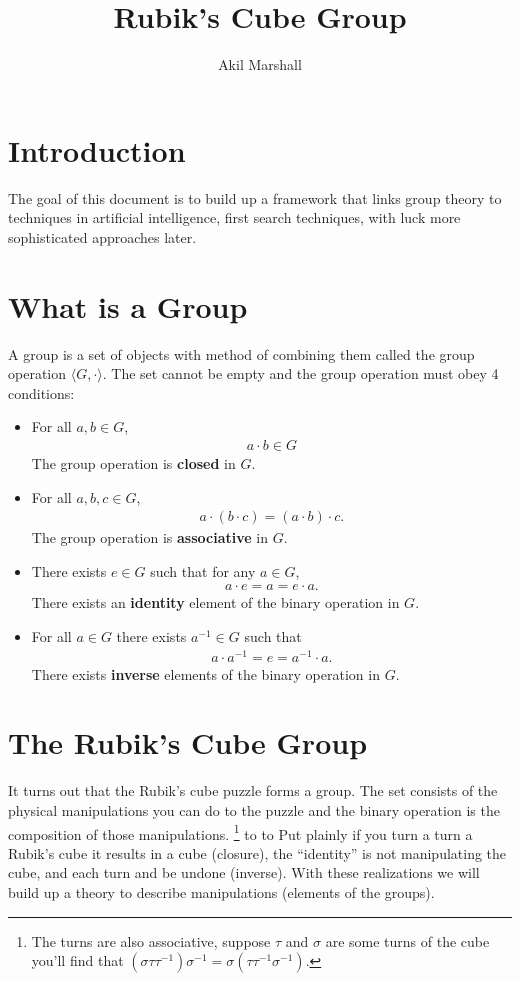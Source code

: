 \documentclass{article}
\title{Rubik's Cube Group}
\author{Akil Marshall}
\begin{document}
\maketitle
\section{Introduction}
The goal of this document is to build up a framework that links group theory to techniques in artificial intelligence, first search techniques, with luck more sophisticated approaches later.

\section{What is a Group}
A group is a set of objects with method of combining them called the group operation $\langle G,\cdot\rangle$. The set cannot be empty and the group operation must obey 4 conditions:
\begin{itemize}
    \item For all $a,b\in G$,
        \begin{align*}
            a\cdot b\in G
        \end{align*}
        The group operation is \textbf{closed} in $G$.
    \item For all $a,b,c\in G$,
        \begin{align*}
            a\cdot(b\cdot c)=(a\cdot b)\cdot c.
        \end{align*}
        The group operation is \textbf{associative} in $G$.
    \item There exists $e\in G$ such that for any $a\in G$,
        \begin{align*}
            a\cdot e=a=e\cdot a.
        \end{align*}
        There exists an \textbf{identity} element of the binary operation in $G$.
    \item For all $a\in G$ there exists  $a^{-1}\in G$ such that
        \begin{align*}
            a\cdot a^{-1}=e=a^{-1}\cdot a.
        \end{align*}
        There exists \textbf{inverse} elements of the binary operation in $G$.
\end{itemize}
\section{The Rubik's Cube Group}
It turns out that the Rubik's cube puzzle forms a group.
The set consists of the physical manipulations you can do to the puzzle and the binary operation is the composition of those manipulations.
\footnote{The turns are also associative, suppose $\tau$ and $\sigma$ are some turns of the cube you'll find that $(\sigma\tau\tau^{-1})\sigma^{-1}=\sigma(\tau\tau^{-1}\sigma^{-1})$.}
to to 
Put plainly if you turn a turn a Rubik's cube it results in a cube (closure), the ``identity'' is not manipulating the cube, and each turn and be undone (inverse). With these realizations we will build up a theory to describe manipulations (elements of the groups).
\end{document}
